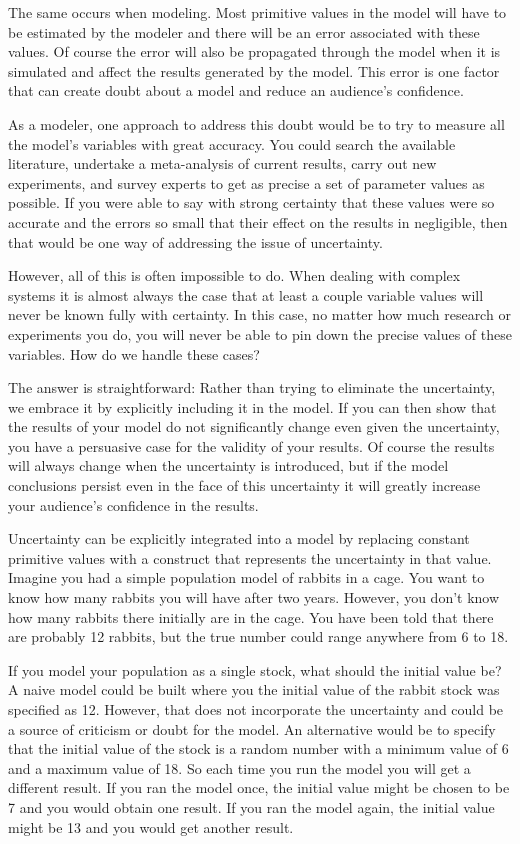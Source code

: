 \documentclass[]{memoir}
\begin{document}
The same occurs when modeling. Most primitive values in the model will
have to be estimated by the modeler and there will be an error
associated with these values. Of course the error will also be
propagated through the model when it is simulated and affect the results
generated by the model. This error is one factor that can create doubt
about a model and reduce an audience's confidence.

As a modeler, one approach to address this doubt would be to try to
measure all the model's variables with great accuracy. You could search
the available literature, undertake a meta-analysis of current results,
carry out new experiments, and survey experts to get as precise a set of
parameter values as possible. If you were able to say with strong
certainty that these values were so accurate and the errors so small
that their effect on the results in negligible, then that would be one
way of addressing the issue of uncertainty.

However, all of this is often impossible to do. When dealing with
complex systems it is almost always the case that at least a couple
variable values will never be known fully with certainty. In this case,
no matter how much research or experiments you do, you will never be
able to pin down the precise values of these variables. How do we handle
these cases?

The answer is straightforward: Rather than trying to eliminate the
uncertainty, we embrace it by explicitly including it in the model. If
you can then show that the results of your model do not significantly
change even given the uncertainty, you have a persuasive case for the
validity of your results. Of course the results will always change when
the uncertainty is introduced, but if the model conclusions persist even
in the face of this uncertainty it will greatly increase your audience's
confidence in the results.

Uncertainty can be explicitly integrated into a model by replacing
constant primitive values with a construct that represents the
uncertainty in that value. Imagine you had a simple population model of
rabbits in a cage. You want to know how many rabbits you will have after
two years. However, you don't know how many rabbits there initially are
in the cage. You have been told that there are probably 12 rabbits, but
the true number could range anywhere from 6 to 18.

If you model your population as a single stock, what should the initial
value be? A naive model could be built where you the initial value of
the rabbit stock was specified as 12. However, that does not incorporate
the uncertainty and could be a source of criticism or doubt for the
model. An alternative would be to specify that the initial value of the
stock is a random number with a minimum value of 6 and a maximum value
of 18. So each time you run the model you will get a different result.
If you ran the model once, the initial value might be chosen to be 7 and
you would obtain one result. If you ran the model again, the initial
value might be 13 and you would get another result.
\end{document}
